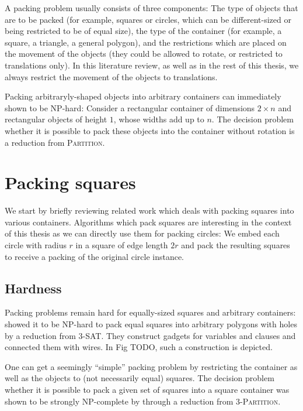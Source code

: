 \documentclass[a4paper,style=print,bibliography=totoc,nexus,lnum,extramargin]{tubsbook}
\begin{document}
A packing problem usually consists of three components: The type of objects that are to be packed (for example, squares or circles, which can be different-sized or being restricted to be of equal size), the type of the container (for example, a square, a triangle, a general polygon), and the restrictions which are placed on the movement of the objects (they could be allowed to rotate, or restricted to translations only). In this literature review, as well as in the rest of this thesis, we always restrict the movement of the objects to translations.

Packing arbitraryly-shaped objects into arbitrary containers can immediately shown to be NP-hard: Consider a rectangular container of dimensions $2 \times n$ and rectangular objects of height $1$, whose widths add up to $n$. The decision problem whether it is possible to pack these objects into the container without rotation is a reduction from \textsc{Partition}.

\section{Packing squares}

We start by briefly reviewing related work which deals with packing squares into various containers.
Algorithms which pack squares are interesting in the context of this thesis as we can directly use them for packing circles: We embed each circle with radius $r$ in a square of edge length $2r$ and pack the resulting squares to receive a packing of the original circle instance.

\subsection{Hardness}

Packing problems remain hard for equally-sized squares and arbitrary containers: \textcite{FPT1981optimal} showed it to be NP-hard to pack equal squares into arbitrary polygons with holes by a reduction from \textsc{3-SAT}. They construct gadgets for variables and clauses and connected them with wires. In Fig TODO, such a construction is depicted.

One can get a seemingly “simple” packing problem by restricting the container as well as the objects to (not necessarily equal) squares.
The decision problem whether it is possible to pack a given set of squares into a square container was shown to be strongly NP-complete by \textcite{LTWYC1990packing} through a reduction from \textsc{3-Partition}.
\end{document}
